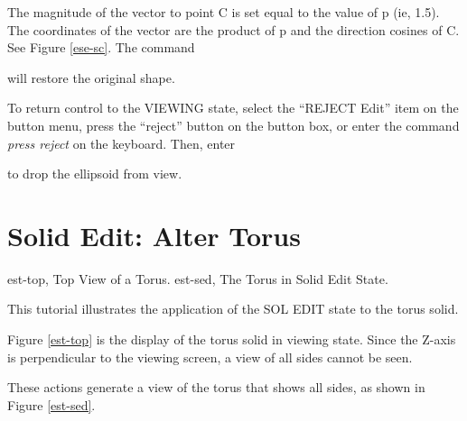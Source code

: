 The magnitude of the vector to point C is set equal to the value of p
(ie, 1.5).
The coordinates of the vector are the product of p and the
direction cosines of C.  See Figure \ref{ese-sc}.  The command


will restore the original shape.

To return control to the VIEWING state, select the ``REJECT Edit''
item on the button menu, press the ``reject'' button on the button box,
or enter the command {\em press reject} on the keyboard.
Then, enter


to drop the ellipsoid from view.

\section{Solid Edit: Alter Torus}
\mfig est-top, Top View of a Torus.
\mfig est-sed, The Torus in Solid Edit State.

This tutorial illustrates the application of the SOL EDIT state to the
torus solid.


Figure \ref{est-top} is the display of the torus solid in viewing state.
Since the
Z-axis is perpendicular to the viewing screen, a view of all sides cannot be
seen.


These actions generate a view of the torus that shows all sides,
as shown in Figure \ref{est-sed}.


